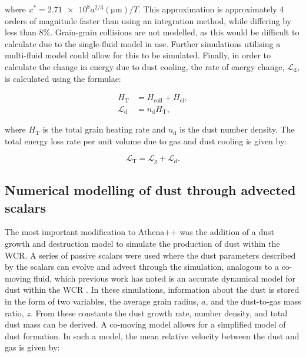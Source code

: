\documentclass[fleqn,usenatbib]{mnras}
\newcommand{\rms}[1]{\ensuremath{_{\text{#1}}}}
\begin{document}
\noindent
where $x^* = \num{2.71e8} a^{2/3} (\si{\micro\metre})/T$.
This approximation is approximately 4 orders of magnitude faster than using an integration method, while differing by less than 8\%.
Grain-grain collisions are not modelled, as this would be difficult to calculate due to the single-fluid model in use.
Further simulations utilising a multi-fluid model could allow for this to be simulated.
Finally, in order to calculate the change in energy due to dust cooling, the rate of energy change, $\mathcal{L}\rms{d}$, is calculated using the formulae:

\begin{subequations}
  \label{eq:transparency-approximation}
  \begin{align}
    H\rms{T}           & = H_\text{coll} + H_\text{el} , \\
    \mathcal{L}\rms{d} & = n_\text{d} H\rms{T} ,
  \end{align}
\end{subequations}

\noindent
where $H\rms{T}$ is the total grain heating rate
and $n_\text{d}$ is the dust number density.
The total energy loss rate per unit volume due to gas and dust cooling is given by:

\begin{equation}
	\mathcal{L}\rms{T} = \mathcal{L}\rms{g} + \mathcal{L}\rms{d} .
\end{equation}


\subsection{Numerical modelling of dust through advected scalars}

The most important modification to Athena++ was the addition of a dust growth and destruction model to simulate the production of dust within the WCR.
A series of passive scalars were used where the dust parameters described by the scalars can evolve and advect through the simulation, analogous to a co-moving fluid, which previous work has noted is an accurate dynamical model for dust within the WCR \citep{hendrix_pinwheels_2016}.
In these simulations, information about the dust is stored in the form of two variables, the average grain radius, $a$, and the dust-to-gas mass ratio, $z$.
From these constants the dust growth rate, number density, and total dust mass can be derived.
A co-moving model allows for a simplified model of dust formation. In such a model, the mean relative velocity between the dust and gas is given by:
\end{document}
